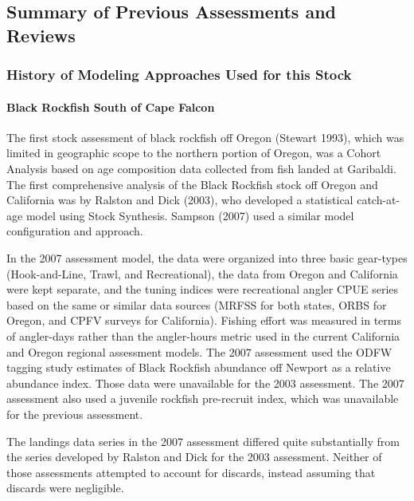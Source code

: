 \documentclass[11pt,
  letterpaper,
]{article}
\begin{document}
\hypertarget{summary-of-previous-assessments-and-reviews}{%
\subsection{Summary of Previous Assessments and Reviews}\label{summary-of-previous-assessments-and-reviews}}

\hypertarget{history-of-modeling-approaches-used-for-this-stock}{%
\subsubsection{History of Modeling Approaches Used for this Stock}\label{history-of-modeling-approaches-used-for-this-stock}}

\hypertarget{black-rockfish-south-of-cape-falcon}{%
\paragraph{Black Rockfish South of Cape Falcon}\label{black-rockfish-south-of-cape-falcon}}

The first stock assessment of black rockfish off Oregon (Stewart 1993), which was limited in geographic scope to the northern portion of Oregon, was a Cohort Analysis based on age composition data collected from fish landed at Garibaldi. The first comprehensive analysis of the Black Rockfish stock off Oregon and California was by Ralston and Dick (2003), who developed a statistical catch-at-age model using Stock Synthesis. Sampson (2007) used a similar model configuration and approach.

In the 2007 assessment model, the data were organized into three basic gear-types (Hook-and-Line, Trawl, and Recreational), the data from Oregon and California were kept separate, and the tuning indices were recreational angler CPUE series based on the same or similar data sources (MRFSS for both states, ORBS for Oregon, and CPFV surveys for California). Fishing effort was measured in terms of angler-days rather than the angler-hours metric used in the current California and Oregon regional assessment models. The 2007 assessment used the ODFW tagging study estimates of Black Rockfish abundance off Newport as a relative abundance index. Those data were unavailable for the 2003 assessment. The 2007 assessment also used a juvenile rockfish pre-recruit index, which was unavailable for the previous assessment.

The landings data series in the 2007 assessment differed quite substantially from the series developed by Ralston and Dick for the 2003 assessment. Neither of those assessments attempted to account for discards, instead assuming that discards were negligible.
\end{document}

